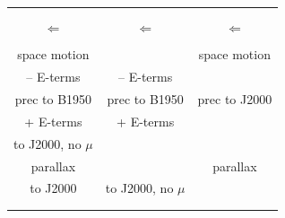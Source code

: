 \documentclass[twoside,11pt]{starlink}
\begin{document}
\begin{scriptsize}
\begin{terminalv}
\begin{figure}
  \begin{small}
    \begin{center}
      \begin{tabular}{|cccccc|}   \hline
        & & & & & \\
        \hspace{6em} & \hspace{6em} & \hspace{6em} &
           \hspace{6em} & \hspace{6em} & \hspace{6em}  \\
        \multicolumn{2}{|c}{\hspace{1em}\fbox{FK4, any eqnx}$\Leftarrow$} &
           \multicolumn{2}{c}{\hspace{1em}\fbox{FK4, no $\mu$, any eqnx}$\Leftarrow$} &
           \multicolumn{2}{c|}{\hspace{1em}\fbox{FK5, any eqnx}$\Leftarrow$} \\
        & \multicolumn{2}{|c|}{} & \multicolumn{2}{c|}{} & \\
        \multicolumn{2}{|c}{space motion} & \multicolumn{1}{c|}{} & &
           \multicolumn{2}{c|}{space motion} \\
        \multicolumn{2}{|c}{-- E-terms} &
           \multicolumn{2}{c}{-- E-terms} & \multicolumn{1}{c|}{} & \\
        \multicolumn{2}{|c}{prec to B1950} & \multicolumn{2}{c}{prec to B1950} &
           \multicolumn{2}{c|}{prec to J2000} \\
        \multicolumn{2}{|c}{+ E-terms} &
           \multicolumn{2}{c}{+ E-terms} & \multicolumn{1}{c|}{} & \\
        \multicolumn{2}{|c}{to J2000, no $\mu$} & \multicolumn{1}{c|}{} &
           \multicolumn{2}{c|}{} & \\
        \multicolumn{2}{|c}{parallax} & \multicolumn{1}{c|}{} & &
           \multicolumn{2}{c|}{parallax} \\
        \multicolumn{2}{|c}{to J2000} & \multicolumn{2}{c}{to J2000, no $\mu$} &
           \multicolumn{1}{c|}{} & \\
        & \multicolumn{2}{|c|}{} & \multicolumn{2}{c|}{} & \\ \cline{2-5}
        \multicolumn{3}{|c|}{} & & & \\

\end{tabular}
\end{center}
\end{small}
\end{figure}
\end{terminalv}
\end{scriptsize}
\end{document}
